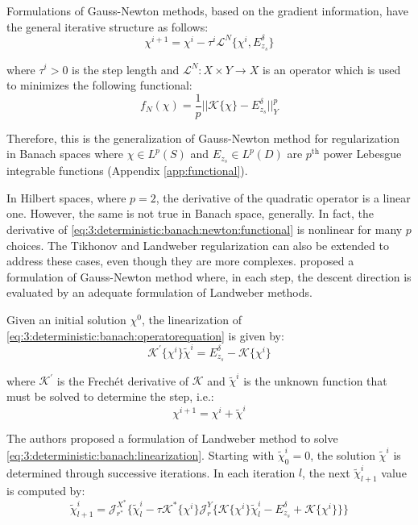 			Formulations of Gauss-Newton methods, based on the gradient information, have the general iterative structure as follows:
			\begin{equation}
				\chi^{i+1} = \chi^{i} - \tau^i\mathcal{L}^N\{\chi^{i},E_{z_s}^\delta\} \label{eq:3:deterministic:banach:newton:general}
			\end{equation}
		
			\noindent where $\tau^i>0$ is the step length and $\mathcal{L}^N : X \times Y \rightarrow X$ is an operator which is used to minimizes the following functional:
			\begin{equation}
				f_N(\chi) = \frac{1}{p} ||\mathcal{K}\{\chi\}-E_{z_s}^\delta||^p_Y \label{eq:3:deterministic:banach:newton:functional}
			\end{equation}

			Therefore, this is the generalization of Gauss-Newton method for regularization in Banach spaces where $\chi\in L^p(S)$ and $E_{z_s}\in L^p(D)$ are $p^{\mathrm{th}}$ power Lebesgue integrable functions (Appendix \ref{app:functional}).
			
			In Hilbert spaces, where $p=2$, the derivative of the quadratic operator is a linear one. However, the same is not true in Banach space, generally. In fact, the derivative of \eqref{eq:3:deterministic:banach:newton:functional} is nonlinear for many $p$ choices. The Tikhonov and Landweber regularization can also be extended to address these cases, even though they are more complexes. \cite{estatico2012novel} proposed a formulation of Gauss-Newton method where, in each step, the descent direction is evaluated by an adequate formulation of Landweber methods.
			
			Given an initial solution $\chi^0$, the linearization of \eqref{eq:3:deterministic:banach:operatorequation} is given by:
			\begin{equation}
				\mathcal{K}^\prime\{\chi^i\}\tilde{\chi}^i = E_{z_s}^\delta-\mathcal{K}\{\chi^i\} \label{eq:3:deterministic:banach:linearization}
			\end{equation}

			\noindent where $\mathcal{K}^\prime$ is the Frechét derivative of $\mathcal{K}$ and $\tilde{\chi}^i$ is the unknown function that must be solved to determine the step, i.e.:
			\begin{equation}
				\chi^{i+1} = \chi^{i} + \tilde{\chi}^i \label{eq:3:deterministic:banach:contraststep}
			\end{equation}
		
			The authors proposed a formulation of Landweber method to solve \eqref{eq:3:deterministic:banach:linearization}. Starting with $\tilde{\chi}^i_0 = 0$, the solution $\tilde{\chi}^i$ is determined through successive iterations. In each iteration $l$, the next $\tilde{\chi}^i_{l+1}$ value is computed by:
			\begin{equation}
				\tilde{\chi}^i_{l+1} = \mathcal{J}^{X^*}_{r^*}\Big\{\tilde{\chi}^i_{l} - \tau\mathcal{K}^*\{\chi^i\}\mathcal{J}^Y_r\big\{\mathcal{K}\{\chi^i\}\tilde{\chi}^i_l-E_{z_s}^\delta+\mathcal{K}\{\chi^i\}\big\}\Big\} \label{eq:3:deterministic:banach:landweberstep}
			\end{equation}
		
